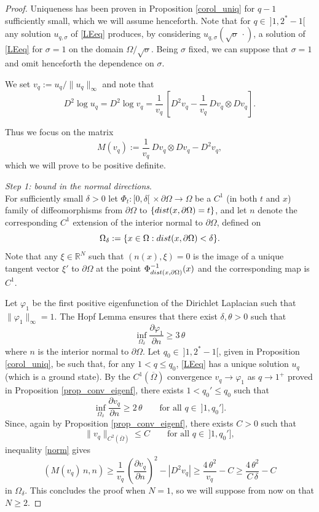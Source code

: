 \documentclass[10pt,a4paper]{amsart}
\newcommand{\R}{{\mathbb R}}
\newcommand{\beq}{\begin{equation}}
\newcommand{\eeq}{\end{equation}}
\renewcommand{\ge}{\geqslant}
\renewcommand{\le}{\leqslant}
\begin{document}
\begin{proof}
Uniqueness has been proven in Proposition \ref{corol_uniq} for $q-1$ sufficiently small, which we will assume henceforth. 
Note that for $q\in\ ]1, 2^*-1[$ any solution $u_{q, \sigma}$ of \eqref{LEeq} produces, by considering $u_{q, \sigma}(\sqrt{\sigma}\, \cdot)$, a solution of \eqref{LEeq} for $\sigma=1$ on the domain $\Omega/\sqrt{\sigma}$. 
Being $\sigma$ fixed, we can suppose that $\sigma=1$ and omit henceforth the dependence on $\sigma$. 
 
We set $v_q:=u_q/\|u_q\|_\infty$ and note that 
 \[
 D^2\log u_q= D^2\log v_q=\frac{ 1}{v_q}\,\left[ D^2v_q-\frac{1}{v_q}\, Dv_q\otimes Dv_q\right].
 \]

 Thus we focus on the matrix 
\begin{equation}\label{eq_def_Mq}
 M(v_q):= 
 \frac{1}{v_q}\, Dv_q\otimes Dv_q -D^2v_q,
\end{equation}
which we will prove to be positive definite.

\smallskip
 {\em Step 1: bound in the normal directions}.\ \\
For sufficiently small $\delta>0$ let $\Phi_t:[0, \delta[\,\times \partial\Omega\to \Omega$ be a $C^1$ (in both $t$ and $x$) family of diffeomorphisms from $\partial\Omega$ to $\{{\rm dist}(x, \partial\Omega)=t\}$, and let $n$ denote the corresponding $C^1$ extension of the interior normal to $\partial\Omega$, defined on 
\[
\Omega_\delta :=\{x\in \Omega:{\rm dist}(x, \partial\Omega)<\delta\}.
\]
 Note that any $\xi\in \R^N$ such that $(n(x), \xi)=0$ is the image of a unique tangent vector $\xi'$ to $\partial\Omega$ at the point $\Phi^{-1}_{{\rm dist}(x, \partial\Omega)}(x)$ and the corresponding map is $C^1$. 

Let $\varphi_1$ be the first positive eigenfunction of the Dirichlet Laplacian such that $\|\varphi_1\|_\infty=1$. 
 The Hopf Lemma ensures that there exist $\delta, \theta>0$ such that 
 \[
 \inf_{\Omega_{\delta}}\frac{\partial \varphi_1}{\partial n}\ge 3\, \theta
 \]
 where $n$ is the interior normal to $\partial\Omega$.
Let $q_0\in \ ]1, 2^*-1[$, given in Proposition \ref{corol_uniq}, be such that, for any $1<q\le q_0$, \eqref{LEeq} has a unique solution $u_q$ (which is a ground state).
 By the $C^1(\overline{\Omega})$ convergence $v_q\to \varphi_1$ as $q\to 1^+$ proved in Proposition \ref{prop_conv_eigenf}, there exists $1<q_0'\le q_0 $ such that 
 \beq
 \label{norm}
 \inf_{\Omega_\delta}\frac{\partial v_q}{\partial n}\ge 2\, \theta \qquad \text{for all $q\in \ ]1, q_0']$}.
 \eeq
 Since, again by Proposition \ref{prop_conv_eigenf}, there exists $C>0$ such that
 \begin{equation}\label{eq_unif_c2_est}
 \|v_q\|_{C^2(\overline{\Omega})} \leq C \qquad \text{for all $q\in \ ]1, q_0']$},
 \end{equation}
inequality \eqref{norm} gives
 \beq
 \label{norm2}
 \left(M(v_q)\, n, n\right)\ge \frac{1}{v_q}\, \left(\frac{\partial v_q}{\partial n}\right)^2-|D^2 v_q|\ge \frac{4\, \theta^2}{v_q} -C\ge \frac{4\, \theta^2}{C\, \delta}- C
 \eeq
in $\Omega_\delta$. 
This concludes the proof when $N=1$, so we will suppose from now on that $N\ge 2$.


\end{proof}
\end{document}
